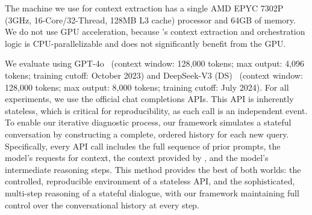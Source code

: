 \begin{table}[t]
\centering
{}
\caption{Overview of Network Configurations Used in Evaluation.}
\label{tab:dataset_summary}
\end{table}

The machine we use for context extraction has a single AMD EPYC 7302P (3GHz, 16-Core/32-Thread, 128MB L3 cache) processor and 64GB of memory. We do not use GPU acceleration, because \sysname{}'s context extraction and orchestration logic is CPU-parallelizable and does not significantly benefit from the GPU.

We evaluate \sysname{} using GPT-4o~\cite{achiam2023gpt}
(context window: 128,000 tokens; max output: 4,096 tokens; training cutoff: October 2023)
and DeepSeek-V3 (DS)~\cite{deepseekai2024deepseekv3technicalreport}
(context window: 128,000 tokens; max output: 8,000 tokens; training cutoff: July 2024). For all experiments, we use the official chat completions APIs. This API is inherently stateless, which is critical for reproducibility, as each call is an independent event. To enable our iterative diagnostic process, our framework simulates a stateful conversation by constructing a complete, ordered history for each new query. Specifically, every API call includes the full sequence of prior prompts, the model's requests for context, the context provided by \sysname{}, and the model's intermediate reasoning steps. This method provides the best of both worlds: the controlled, reproducible environment of a stateless API, and the sophisticated, multi-step reasoning of a stateful dialogue, with our framework maintaining full control over the conversational history at every step.

